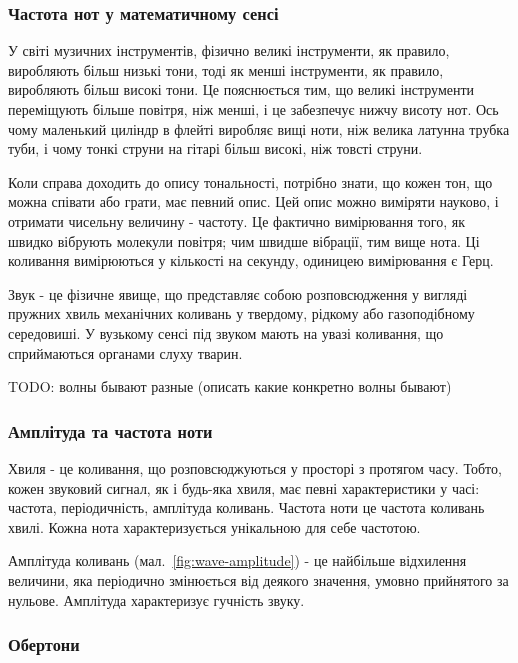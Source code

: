 \subsubsection{Частота нот у математичному сенсі}

У світі музичних інструментів, фізично великі інструменти, як правило, виробляють більш низькі тони, тоді як менші інструменти, як правило, виробляють більш високі тони. Це пояснюється тим, що великі інструменти переміщують більше повітря, ніж менші, і це забезпечує нижчу висоту нот. Ось чому маленький циліндр в флейті виробляє вищі ноти, ніж велика латунна трубка туби, і чому тонкі струни на гітарі більш високі, ніж товсті струни.

Коли справа доходить до опису тональності, потрібно знати, що кожен тон, що можна
співати або грати, має певний опис. Цей опис можно виміряти науково, і отримати чисельну величину - частоту. Це фактично вимірювання того, як швидко вібрують молекули повітря; чим швидше вібрації, тим вище нота. Ці коливання вимірюються у кількості на секунду, одиницею вимірювання є Герц. \cite{miller2005complete}

Звук - це фізичне явище, що представляє собою розповсюдження у вигляді пружних хвиль механічних коливань у твердому, рідкому або газоподібному середовиші. У вузькому сенсі під звуком мають на увазі коливання, що сприймаються органами слуху тварин.


TODO: волны бывают разные (описать какие конкретно волны бывают)

\subsubsection{Амплітуда та частота ноти}

Хвиля - це коливання, що розповсюджуються у просторі з протягом часу. Тобто, кожен звуковий сигнал, як і будь-яка хвиля, має певні характеристики у часі: частота, періодичність, амплітуда коливань.  Частота ноти це частота коливань хвилі. Кожна нота характеризується унікальною для себе частотою.

Амплітуда коливань (мал.~\ref{fig:wave-amplitude}) - це найбільше відхилення величини, яка періодично змінюється від деякого значення, умовно прийнятого за нульове. Амплітуда характеризує гучність звуку. \cite{яворський2007довідник}



\subsubsection{Обертони}

